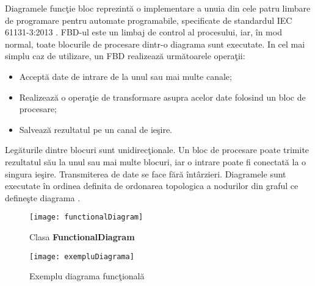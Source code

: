 Diagramele funcţie bloc reprezintă o implementare a unuia din cele patru limbare de programare pentru automate programabile, specificate de standardul IEC 61131-3:2013 \autocite[128-140]{IEC61131-3}. FBD-ul este un limbaj de control al procesului, iar, în mod normal, toate blocurile de procesare dintr-o diagrama sunt executate.
In cel mai simplu caz de utilizare, un FBD realizează următoarele operaţii:
\begin{itemize}
	\item Acceptă date de intrare de la unul sau mai multe canale;
	\item Realizează o operaţie de transformare asupra acelor date folosind un bloc de procesare;
	\item Salvează rezultatul pe un canal de ieşire.
\end{itemize}
Legăturile dintre blocuri sunt unidirecţionale. Un bloc de procesare poate trimite rezultatul său la unul sau mai multe blocuri, iar o intrare poate fi conectată la o singura ieşire. Transmiterea de date se face fără întârzieri. Diagramele sunt executate în ordinea definita de ordonarea topologica a nodurilor din graful ce defineşte diagrama \autocite[20-50]{IEC61499}. 
\begin{figure}[H]
	\centering
	\texttt{[image: functionalDiagram]}
	\caption{Clasa \textbf{FunctionalDiagram}}
\end{figure}

\begin{figure}[H]
	\centering
	\texttt{[image: exempluDiagrama]}
	\caption{Exemplu diagrama funcţională}
	\label{fig:exempluDiagrama}
\end{figure}

